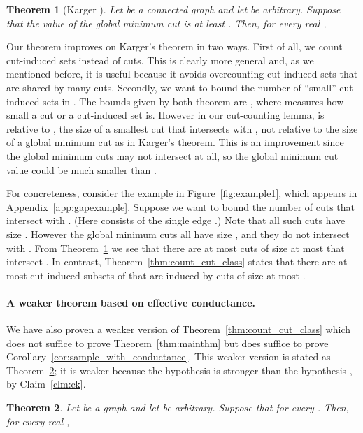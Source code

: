 \documentclass[11pt]{article}
\numberwithin{equation}{section}
\newtheorem{theorem}{Theorem}[section]
\newcommand{\Appendix}[1]{Appendix~\ref{app:#1}}
\newcommand{\Claim}[1]{Claim~\ref{clm:#1}}
\newcommand{\Corollary}[1]{Corollary~\ref{cor:#1}}
\newcommand{\Figure}[1]{Figure~\ref{fig:#1}}
\newcommand{\TheoremName}[1]{\label{thm:#1}}
\newcommand{\Theorem}[1]{Theorem~\ref{thm:#1}}
\begin{document}
\begin{theorem}[Karger \protect\cite{KargerContract,KargerStein}]
\TheoremName{karger}
Let  be a connected graph and let  be arbitrary.
Suppose that the value of the global minimum cut is at least .
Then, for every real ,

\end{theorem}

Our theorem improves on Karger's theorem in two ways.
First of all, we count cut-induced sets instead of cuts.
This is clearly more general and, as we mentioned before,
it is useful because it avoids overcounting cut-induced sets that are shared by many cuts.
Secondly, we want to bound the number of ``small'' cut-induced sets in .
The bounds given by both theorem are ,
where  measures how small a cut or a cut-induced set is.
However in our cut-counting lemma,  is 
relative to , the size of a smallest cut that intersects with ,
not relative to the size of a global minimum cut as in Karger's theorem.
This is an improvement since the global minimum cuts may not intersect  at all,
so the global minimum cut value could be much smaller than . 

For concreteness, consider the example in \Figure{example1},
which appears in \Appendix{gapexample}.
Suppose we want to bound the number of cuts that intersect with .
(Here  consists of the single edge .)
Note that all such cuts have size .
However the global minimum cuts all have size , and they do not intersect with .
From \Theorem{karger} we see that there are at most  cuts of size at most 
that intersect .
In contrast, \Theorem{count_cut_class} states that
there are at most  cut-induced subsets of  
that are induced by cuts of size at most .



\paragraph{A weaker theorem based on effective conductance.}
We have also proven a weaker version of \Theorem{count_cut_class} which does not
suffice to prove \Theorem{mainthm} but does suffice to prove
\Corollary{sample_with_conductance}.
This weaker version is stated as \Theorem{count_cut_2};
it is weaker because the hypothesis  is stronger than the hypothesis ,
by \Claim{ck}.

\begin{theorem}
\TheoremName{count_cut_2}
Let  be a graph and let  be arbitrary.
Suppose that  for every .
Then, for every real ,

\end{theorem}
\end{document}
